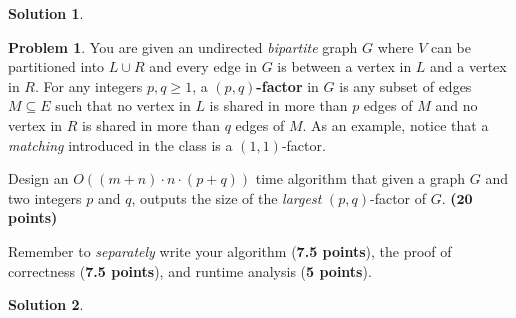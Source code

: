\documentclass{article}
\theoremstyle{definition}
\newtheorem{problem}{Problem}
\newtheorem*{solution*}{Solution}
\newenvironment{solution}{\begin{solution*}}{{} \end{solution*}}
\newcommand{\grade}[1]{\hfill{\textbf{($\mathbf{#1}$ points)}}}
\begin{document}
\medskip
		\begin{solution}
		\end{solution}
		
\newpage



\begin{problem}\label{flow}
	You are given an undirected \emph{bipartite} graph $G$ where $V$ can be partitioned into $L \cup R$ and every edge in $G$ is between a vertex in $L$ and a vertex in $R$. 
	For any integers $p,q \geq 1$, a \textbf{$(p,q)$-factor} in $G$ is any subset of edges $M \subseteq E$ such that no vertex in $L$ is shared in more than $p$ edges of $M$ and no vertex in $R$ is shared in more than $q$ edges of $M$. 
	As an example, notice that a \emph{matching} introduced in the class is a $(1,1)$-factor. 
	
	
Design an $O((m+n) \cdot n \cdot (p+q))$ time algorithm that given a graph $G$ and two integers $p$ and $q$, outputs the size of the \emph{largest} $(p,q)$-factor of $G$. \grade{20}
	
	\medskip
	
	Remember to \emph{separately} write your algorithm (\textbf{7.5 points}), the proof of correctness (\textbf{7.5 points}), and runtime analysis (\textbf{5 points}). 

\end{problem}

\medskip
		\begin{solution}
		\end{solution}
		
\newpage
\end{document}
